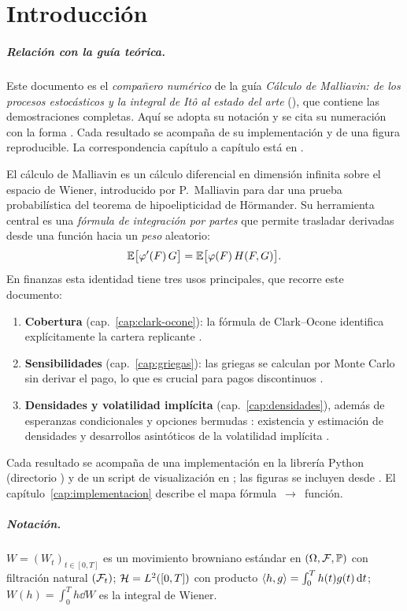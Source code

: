 \chapter{Introducción}

\paragraph{Relación con la guía teórica.} Este documento es el \emph{compañero
numérico} de la guía \emph{Cálculo de Malliavin: de los procesos estocásticos y la
integral de Itô al estado del arte} (),
que contiene las demostraciones completas. Aquí se adopta su notación y se cita su
numeración con la forma . Cada resultado se acompaña de su
implementación y de una figura reproducible. La correspondencia capítulo a capítulo está en
.

El cálculo de Malliavin es un cálculo diferencial en dimensión infinita sobre el
espacio de Wiener, introducido por P.~Malliavin \cite{malliavin1978} para dar una
prueba probabilística del teorema de hipoelipticidad de Hörmander. Su herramienta
central es una \emph{fórmula de integración por partes} que permite trasladar
derivadas desde una función hacia un \emph{peso} aleatorio:
\[
  \mathbb{E}\big[\varphi'(F)\,G\big] = \mathbb{E}\big[\varphi(F)\,H(F,G)\big].
\]
En finanzas esta identidad tiene tres usos principales, que recorre este documento:
\begin{enumerate}
  \item \textbf{Cobertura} (cap.~\ref{cap:clark-ocone}): la fórmula de
        Clark--Ocone identifica explícitamente la cartera replicante
        \cite{ocone1984,oconekaratzas1991}.
  \item \textbf{Sensibilidades} (cap.~\ref{cap:griegas}): las griegas se calculan
        por Monte Carlo sin derivar el pago, lo que es crucial para pagos
        discontinuos \cite{fournie1999,fournie2001,benhamou2003}.
  \item \textbf{Densidades y volatilidad implícita} (cap.~\ref{cap:densidades}), además de esperanzas condicionales y opciones bermudas \cite{bally2005}:
        existencia y estimación de densidades \cite{nualart2006} y desarrollos
        asintóticos de la volatilidad implícita \cite{alos2007,alosgarcialorite2021}.
\end{enumerate}

Cada resultado se acompaña de una implementación en la librería Python
 (directorio ) y de un script de
visualización en ; las figuras se incluyen desde
. El capítulo~\ref{cap:implementacion} describe el mapa
fórmula~$\to$~función.

\paragraph{Notación.} $W=(W_t)_{t\in[0,T]}$ es un movimiento browniano estándar en
$(\Omega,\mathcal{F},\mathbb{P})$ con filtración natural $(\mathcal{F}_t)$; $\mathcal{H}=L^2([0,T])$ con producto
$\langle h, g \rangle=\int_0^T h(t)g(t)\,\mathrm{d} t$; $W(h)=\int_0^T h\dd W$ es la integral de Wiener.
